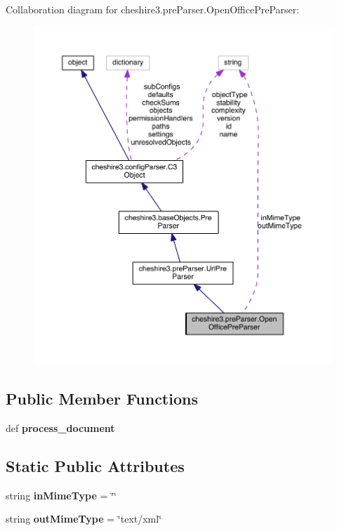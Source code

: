 Collaboration diagram for cheshire3.\-pre\-Parser.\-Open\-Office\-Pre\-Parser\-:
\nopagebreak
\begin{figure}[H]
\begin{center}
\leavevmode
\includegraphics[width=350pt]{classcheshire3_1_1pre_parser_1_1_open_office_pre_parser__coll__graph}
\end{center}
\end{figure}
\subsection*{Public Member Functions}
\begin{DoxyCompactItemize}
\item 
\hypertarget{classcheshire3_1_1pre_parser_1_1_open_office_pre_parser_a2187c71048cedea792f62d90d80acc72}{def {\bfseries process\-\_\-document}}\label{classcheshire3_1_1pre_parser_1_1_open_office_pre_parser_a2187c71048cedea792f62d90d80acc72}

\end{DoxyCompactItemize}
\subsection*{Static Public Attributes}
\begin{DoxyCompactItemize}
\item 
\hypertarget{classcheshire3_1_1pre_parser_1_1_open_office_pre_parser_a64a8743881f2729e90e2ecbd26db539a}{string {\bfseries in\-Mime\-Type} = \char`\"{}\char`\"{}}\label{classcheshire3_1_1pre_parser_1_1_open_office_pre_parser_a64a8743881f2729e90e2ecbd26db539a}

\item 
\hypertarget{classcheshire3_1_1pre_parser_1_1_open_office_pre_parser_a1a8bff22547bf8fdbff39b31376c6636}{string {\bfseries out\-Mime\-Type} = \char`\"{}text/xml\char`\"{}}\label{classcheshire3_1_1pre_parser_1_1_open_office_pre_parser_a1a8bff22547bf8fdbff39b31376c6636}

\end{DoxyCompactItemize}
